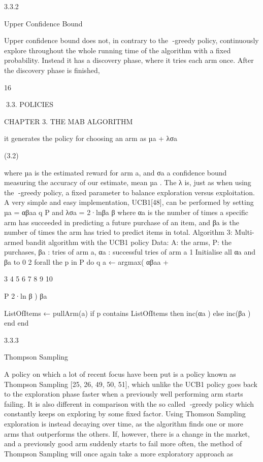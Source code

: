 3.3.2

Upper Confidence Bound

Upper confidence bound does not, in contrary to the -greedy policy, continuously explore
throughout the whole running time of the algorithm with a fixed probability. Instead it
has a discovery phase, where it tries each arm once. After the discovery phase is finished,

16

3.3. POLICIES

CHAPTER 3. THE MAB ALGORITHM

it generates the policy for choosing an arm as
µa + λσa

(3.2)

where µa is the estimated reward for arm a, and σa a confidence bound measuring the
accuracy of our estimate, mean µa . The λ is, just as when using the -greedy policy, a
fixed parameter to balance exploration versus exploitation.
A very simple and easy implementation, UCB1[48], can be performed by setting µa = αβaa
q P
and λσa = 2·lnβa β where αa is the number of times a specific arm has succeeded in
predicting a future purchase of an item, and βa is the number of times the arm has tried
to predict items in total.
Algorithm 3: Multi-armed bandit algorithm with the UCB1 policy
Data: A: the arms, P: the purchases, βa : tries of arm a, αa : successful tries of
arm a
1 Initialise all αa and βa to 0
2 forall the p in P do
q
a ← argmax( αβaa +

3
4
5
6
7
8
9
10

P
2·ln β
)
βa

ListOfItems ← pullArm(a)
if p contains ListOfItems then
inc(αa )
else
inc(βa )
end
end

3.3.3

Thompson Sampling

A policy on which a lot of recent focus have been put is a policy known as Thompson
Sampling [25, 26, 49, 50, 51], which unlike the UCB1 policy goes back to the exploration
phase faster when a previously well performing arm starts failing. It is also different in
comparison with the so called -greedy policy which constantly keeps on exploring by
some fixed factor. Using Thomson Sampling exploration is instead decaying over time,
as the algorithm finds one or more arms that outperforms the others. If, however, there
is a change in the market, and a previously good arm suddenly starts to fail more often,
the method of Thompson Sampling will once again take a more exploratory approach as

